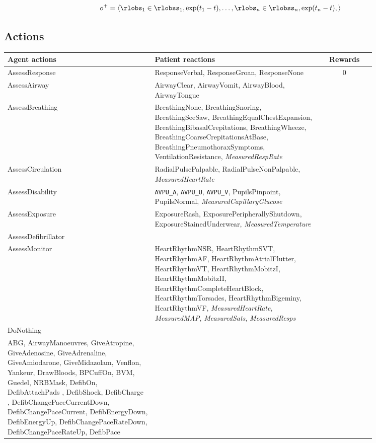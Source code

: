 \begin{equation}
     o^{+} = \langle \rlobs_1 \in \rlobss_1, \exp(t_1-t), \dots, \rlobs_n \in \rlobss_n, \exp(t_n-t), \rangle
\end{equation}

\newpage
\subsection{Actions}
\label{sec:auto-als-act}

\begin{table}[H]
\begin{tabular}{|p{0.4\linewidth}|p{0.45\linewidth}|c|}
\toprule
Agent actions &
  Patient reactions & Rewards
   \\
   \midrule
AssessResponse &
  ResponseVerbal,     ResponseGroan,     ResponseNone &
  \multirow{9}{*}{0} \\
AssessAirway &
  AirwayClear,     AirwayVomit,     AirwayBlood,     AirwayTongue &
   \\
AssessBreathing &
  BreathingNone,     BreathingSnoring,     BreathingSeeSaw,     BreathingEqualChestExpansion,     BreathingBibasalCrepitations,     BreathingWheeze,     BreathingCoarseCrepitationsAtBase,     BreathingPneumothoraxSymptoms,  VentilationResistance, \emph{MeasuredRespRate} &
   \\
AssessCirculation &
  RadialPulsePalpable,     RadialPulseNonPalpable, \emph{MeasuredHeartRate} &
   \\
AssessDisability &
  \verb|AVPU_A|,     \verb|AVPU_U|,     \verb|AVPU_V|, PupilsPinpoint,     PupilsNormal, \emph{MeasuredCapillaryGlucose} &
   \\
AssessExposure &
  ExposureRash,     ExposurePeripherallyShutdown,     ExposureStainedUnderwear, \emph{MeasuredTemperature} &
   \\
AssessDefibrillator &
   &
   \\
AssessMonitor &
  HeartRhythmNSR,
    HeartRhythmSVT,
    HeartRhythmAF,
    HeartRhythmAtrialFlutter,
    HeartRhythmVT,
    HeartRhythmMobitzI,
    HeartRhythmMobitzII,
    HeartRhythmCompleteHeartBlock,
    HeartRhythmTorsades,
    HeartRhythmBigeminy,
    HeartRhythmVF, \emph{MeasuredHeartRate}, \emph{MeasuredMAP}, \emph{MeasuredSats}, \emph{MeasuredResps} &
   \\
   DoNothing & & \\
   \midrule
ABG,     AirwayManoeuvres,     GiveAtropine,     GiveAdenosine,     GiveAdrenaline,     GiveAmiodarone,     GiveMidazolam,     Venflon,     Yankeur,     DrawBloods,     BPCuffOn,     BVM,     Guedel,     NRBMask,     DefibOn,     DefibAttachPads ,     DefibShock,     DefibCharge ,     DefibChangePaceCurrentDown,     DefibChangePaceCurrent,     DefibEnergyDown,     DefibEnergyUp,     DefibChangePaceRateDown,     DefibChangePaceRateUp,     DefibPace& 

\end{tabular}
\end{table}
